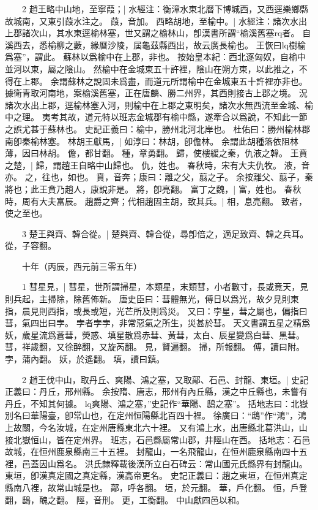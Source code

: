 　　2 趙王略中山地，至寧葭；|{
	水經注：衡漳水東北曆下博城西，又西逕樂鄉縣故城南，又東引葭水注之。
	葭，音加。
}
西略胡地，至榆中。|{
	水經注：諸次水出上郡諸次山，其水東逕榆林塞，世又謂之榆林山，卽漢書所謂“榆溪舊塞rq者。
	自溪西去，悉榆柳之藪，緣曆沙陵，屆龜茲縣西出，故云廣長榆也。
	王恢曰lq樹榆爲塞”，謂此。
	蘇林以爲榆中在上郡，非也。
	按始皇本紀：西北逐匈奴，自榆中並河以東，屬之陰山。
	然榆中在金城東五十許裡，陰山在朔方東，以此推之，不得在上郡。
	余謂蘇林之說固未爲盡，而道元所謂榆中在金城東五十許裡亦非也。
	據衛青取河南地，案榆溪舊塞，正在唐麟、勝二州界，其西則接古上郡之境。
	況諸次水出上郡，逕榆林塞入河，則榆中在上郡之東明矣，諸次水無西流至金城、榆中之理。
	夷考其故，道元特以班志金城郡有榆中縣，遂牽合以爲說，不知此一節之誤尤甚于蘇林也。
	史記正義曰：榆中，勝州北河北岸也。
	杜佑曰：勝州榆林郡南卽秦榆林塞。
}
林胡王獻馬，|{
	如淳曰：林胡，卽儋林。
	余謂此胡種落依阻林薄，因曰林胡。
	儋，都甘翻。
	種，章勇翻。
}
歸，使樓緩之秦，仇液之韓。
	王賁之楚，|{
	歸，謂趙王自略中山歸也。
	仇，姓也。
	春秋時，宋有大夫仇牧。
	液，音亦。
	之，往也，如也。
	賁，音奔；康曰：離之父，翦之子。
	余按離父、翦子，秦將也；此王賁乃趙人，康說非是。
	將，卽亮翻。
}
富丁之魏，|{
	富，姓也。
	春秋時，周有大夫富辰。
}
趙爵之齊；代相趙固主胡，致其兵。|{
	相，息亮翻。
	致者，使之至也。
}

　　3 楚王與齊、韓合從。|{
	楚與齊、韓合從，尋卽倍之，適足致齊、韓之兵耳。
	從，子容翻。
}

　　十年（丙辰，西元前三零五年）

　　1 彗星見，|{
	彗星，世所謂掃星，本類星，末類彗，小者數寸，長或竟天，見則兵起，主掃除，除舊佈新。
	唐史臣曰：彗體無光，傅日以爲光，故夕見則東指，晨見則西指，或長或短，光芒所及則爲災。
	又曰：孛星，彗之屬也，偏指曰彗，氣四出曰孛。
	孛者孛孛，非常惡氣之所生，災甚於彗。
	天文書謂五星之精爲妖，歲星流爲蒼彗，熒惑、填星散爲赤彗、黃彗，太白、辰星變爲白彗、黑彗。
	彗，祥歲翻，又徐醉翻，又旋芮翻。
	見，賢遍翻。
	掃，所報翻。
	傅，讀曰附。
	孛，蒲內翻。
	妖，於遙翻。
	填，讀曰鎮。
}

　　2 趙王伐中山，取丹丘、爽陽、鴻之塞，又取鄗、石邑、封龍、東垣。|{
	史記正義曰：丹丘，邢州縣。
	余按隋、唐志，邢州有內丘縣，漢之中丘縣也，未嘗有丹丘，不知其何據。
	lq爽陽、鴻之塞，”史記作“華陽、鴟之塞”。
	括地志曰：北嶽別名曰華陽臺，卽常山也，在定州恒陽縣北百四十裡。
	徐廣曰：“鴟”作“鴻”，鴻上故關，今名汝城，在定州唐縣東北六十裡。
	又有鴻上水，出唐縣北葛洪山，山接北嶽恒山，皆在定州界。
	班志，石邑縣屬常山郡，井陘山在西。
	括地志：石邑故城，在恒州鹿泉縣南三十五裡。
	封龍山，一名飛龍山，在恒州鹿泉縣南四十五裡，邑蓋因山爲名。
	洪氏隸釋載後漢所立白石碑云：常山國元氏縣界有封龍山。
	東垣，卽漢真定國之真定縣，漢高帝更名。
	史記正義曰：趙之東垣，在恒州真定縣南八裡，故常山城是也。
	鄗，呼各翻。
	垣，於元翻。
	華，戶化翻。
	恒，戶登翻，鴟，醜之翻。
	陘，音刑。
	更，工衡翻。
}
中山獻四邑以和。


